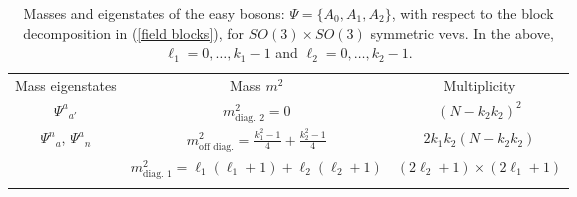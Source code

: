 \begin{table}
%
\begin{center}
%
\begingroup
\setlength{\tabcolsep}{10pt} %
\renewcommand{\arraystretch}{2.0} %
%
\begin{tabular}{ !{\vrule width 1.5pt}c!{\vrule width 1.5pt}c!{\vrule width 1.5pt}c!{\vrule width 1.5pt} }
 	Mass eigenstates & Mass $m^2$ & Multiplicity \\
 	${\Psi^a}_{a'}$ & $m^2_{\text{diag. 2}} = 0$ & $(N-k_2 k_2)^2$ \\
 	\hline
 	${\Psi^n}_{a}$, ${\Psi^a}_{n}$ & $m^2_{\text{off diag.}} = \frac{k_1^2-1}{4} + \frac{k_2^2 -1}{4}$ & $2 k_1 k_2 (N-k_2 k_2)$ \\
 	\hline
 	 & $
 	m^2_{\text{diag. 1}} = \ell_1 (\ell_1 + 1) + \ell_2 (\ell_2 + 1)
 	$ & $
 	(2 \ell_2 + 1) \times (2 \ell_1 + 1)
 	$ \\
\end{tabular}
%
\endgroup
%
\end{center}
%
\caption[Masses and eigenstates for $SO(3) \times SO(3)$ easy bosons]{Masses and eigenstates of the easy bosons: $\Psi = \{ A_0, A_1, A_2 \}$, with respect to the block decomposition in (\ref{field blocks}), for $SO(3) \times SO(3)$ symmetric vevs. In the above, $\ell_1=0,\ldots,k_1-1$ and $\ell_2=0,\ldots,k_2-1$.}
%
\label{tab:boson_masses_easy}
%
\end{table}
%
%


